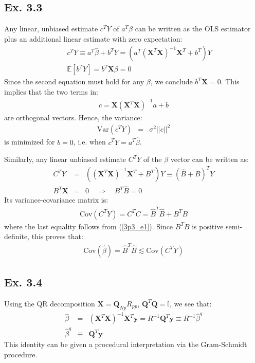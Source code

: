 \subsection*{Ex. 3.3}
Any linear, unbiased estimate $c^T Y$ of $a^T \beta$ can be written as the OLS estimator
plus an additional linear estimate with zero expectation:
\begin{eqnarray*}
&& c^T Y \equiv  a^T \hat{\beta} + b^T Y = \left( a^T \left( \mathbf{X}^T \mathbf{X} \right)^{-1} \mathbf{X}^T + b^T \right) Y \\
&& \mathbb{E} \left[ b^T Y \right] = b^T \mathbf{X} \beta = 0
\end{eqnarray*}
Since the second equation must hold for any $\beta$, we conclude $ b^T \mathbf{X} = 0$. This implies that
the two terms in:
\begin{eqnarray*}
c = \mathbf{X} \left( \mathbf{X} ^T \mathbf{X}  \right)^{-1} a + b
\end{eqnarray*}
are orthogonal vectors. Hence, the variance:
\begin{eqnarray*}
\textrm{Var} \left( c^T Y \right) & = & \sigma^2 ||c||^2
\end{eqnarray*}
is minimized for $b=0$, i.e. when $c^T Y = a^T \hat{\beta}$.

Similarly, any linear unbiased estimate $C^T Y$ of the $\beta$ vector can be written as:
\begin{eqnarray} \nonumber
C^T Y & = & \left( \left( \mathbf{X}^T \mathbf{X} \right)^{-1} \mathbf{X} ^T + B^T \right) Y \equiv \left(  \hat{B} + B \right)^T Y\\ \label{3p3_e1}
B^T \mathbf{X} & = & 0 \quad \Longrightarrow \quad B^T \hat{B} = 0
\end{eqnarray}
Its variance-covariance matrix is:
\begin{eqnarray*}
\textrm{Cov}(C^T Y)  =  C^T C = \hat{B}^T \hat{B} + B^T B
\end{eqnarray*}
where the last equality follows from (\ref{3p3_e1}). Since $B^T B$ is positive semi-definite,
this proves that:
\begin{eqnarray*}
\textrm{Cov}(\hat{\beta}) = \hat{B}^T \hat{B} \lesssim \textrm{Cov}(C^T Y)
\end{eqnarray*}

\subsection*{{\color{red} Ex. 3.4}}
Using the QR decomposition $\mathbf{X} = \mathbf{Q}_{Np} R_{pp}$, $\mathbf{Q}^T \mathbf{Q} = \mathbb{I}$, we see that:
\begin{eqnarray*}
\hat{\beta} & = & \left( \mathbf{X} ^T \mathbf{X} \right)^{-1} \mathbf{X}^T \mathbf{y} = R^{-1} \mathbf{Q}^T \mathbf{y} \equiv R^{-1} \hat{\beta}^q\\
\hat{\beta}^q & \equiv & \mathbf{Q}^T \mathbf{y}
\end{eqnarray*}
This identity can be given a procedural interpretation via the Gram-Schmidt procedure.

